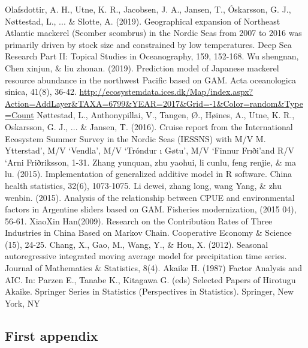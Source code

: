 \documentclass{mcmthesis}
\begin{document}
\begin{thebibliography}{99}
 Olafsdottir, A. H., Utne, K. R., Jacobsen, J. A., Jansen, T., Óskarsson, G. J., Nøttestad, L., ... \& Slotte, A. (2019). Geographical expansion of Northeast Atlantic mackerel (Scomber scombrus) in the Nordic Seas from 2007 to 2016 was primarily driven by stock size and constrained by low temperatures. Deep Sea Research Part II: Topical Studies in Oceanography, 159, 152-168.
  Wu shengnan, Chen xinjun, \& liu zhonan. (2019). Prediction model of Japanese mackerel resource abundance in the northwest Pacific based on GAM. Acta oceanologica sinica, 41(8), 36-42.
\url{http://ecosystemdata.ices.dk/Map/index.aspx?Action=AddLayer&TAXA=6799&YEAR=2017&Grid=-1&Color=random&Type=Count}
 Nøttestad, L., Anthonypillai, V., Tangen, Ø., Høines, A., Utne, K. R., Oskarsson, G. J., ... \& Jansen, T. (2016). Cruise report from the International Ecosystem Summer Survey in the Nordic Seas (IESSNS) with M/V M. Ytterstad’, M/V ‘Vendla’, M/V ‘Tróndur ı Gøtu’, M/V ‘Finnur Frıði’and R/V ‘Arni Friðriksson, 1-31.
 Zhang yunquan, zhu yaohui, li cunlu, feng renjie, \& ma lu. (2015). Implementation of generalized additive model in R software. China health statistics, 32(6), 1073-1075.
Li dewei, zhang long, wang Yang, \& zhu wenbin. (2015). Analysis of the relationship between CPUE and environmental factors in Argentine sliders based on GAM. Fisheries modernization, (2015 04), 56-61.
XiaoXin Han(2009). Research on the Contribution Rates of Three Industries in
China Based on Markov Chain. Cooperative Economy \& Science (15), 24-25.
Chang, X., Gao, M., Wang, Y., \& Hou, X. (2012). Seasonal autoregressive integrated moving average model for precipitation time series. Journal of Mathematics \& Statistics, 8(4).
Akaike H. (1987) Factor Analysis and AIC. In: Parzen E., Tanabe K., Kitagawa G. (eds) Selected Papers of Hirotugu Akaike. Springer Series in Statistics (Perspectives in Statistics). Springer, New York, NY
\end{thebibliography}

\begin{appendices}

\section{First appendix}

\end{appendices}
\end{document}
